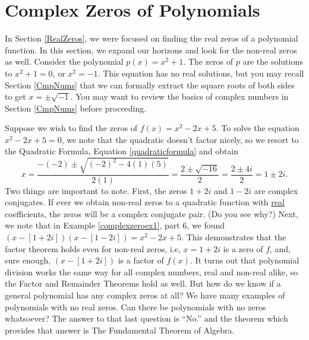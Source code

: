 \section{Complex Zeros of Polynomials}

\label{ComplexZeros}

In Section \ref{RealZeros}, we were focused on finding the real zeros of a polynomial function.  In this section, we expand our horizons and look for the non-real zeros as well.  Consider the polynomial $p(x) = x^2+1$.  The zeros of $p$ are the solutions to $x^2+1=0$, or $x^2=-1$.  This equation has no real solutions, but you may recall Section \ref{CmpNums} that we can formally extract the square roots of both sides to get  $x = \pm \sqrt{-1}$.  You may want to review the basics of complex numbers in Section \ref{CmpNums} before proceeding.

\medskip

Suppose we wish to find the zeros of $f(x) = x^2-2x+5$.  To solve the equation $x^2-2x+5 = 0$, we note that the quadratic doesn't factor nicely, so we resort to the Quadratic Formula, Equation \ref{quadraticformula} and obtain \[ x = \dfrac{-(-2) \pm \sqrt{(-2)^2-4(1)(5)}}{2(1)} = \dfrac{2 \pm \sqrt{-16}}{2} = \dfrac{2 \pm 4i}{2} = 1 \pm 2i.\] Two things are important to note.  First, the zeros $1+2i$ and $1-2i$ are complex conjugates.  If ever we obtain non-real zeros to a quadratic function with \underline{real} coefficients, the zeros  will be a complex conjugate pair. (Do you see why?)  Next, we note that in Example \ref{complexzeroex1}, part 6, we found $(x-[1+2i])(x-[1-2i])=x^2-2x+5$.  This demonstrates that the factor theorem holds even for non-real zeros, i.e,  $x=1+2i$ is a zero of $f$, and, sure enough, $(x-[1+2i])$ is a factor of $f(x)$.  It turns out that polynomial division works the same way for all complex numbers, real and non-real alike, so the Factor and Remainder Theorems hold as well.  But how do we know if a general polynomial has any complex zeros at all?  We have many examples of polynomials with no real zeros.  Can there be polynomials with no zeros whatsoever?  The answer to that last question is ``No.'' and the theorem which provides that answer is  The Fundamental Theorem of Algebra.

\medskip


